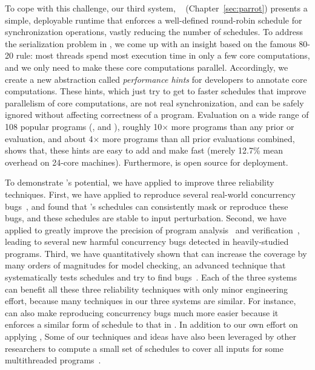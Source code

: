To cope with this challenge, our third \smt system, \parrot~\cite{parrot:sosp13}
(Chapter~\ref{sec:parrot}) presents a simple, deployable runtime that enforces a
well-defined round-robin schedule for synchronization operations, vastly
reducing the number of schedules. To address the serialization problem in \smt,
we come up with an insight based on the famous 80-20 rule: most threads spend
most execution time in only a few core computations, and we only need to make 
these core computations parallel. Accordingly, we create a new abstraction
called \emph{performance hints} for developers to annotate core computations.
These hints, which just try to get to faster schedules that improve parallelism
of core computations, are not real synchronization, and can be safely ignored
without affecting correctness of a program. Evaluation on a wide range of 108
popular programs (\eg, \bdb and \mplayer), roughly 10$\times$ more programs than
any prior \smt or \dmt evaluation, and about 4$\times$ more programs than all
prior evaluations combined, shows that, these hints are easy to add and make
\parrot fast (merely 12.7\% mean overhead on 24-core machines). Furthermore,
\parrot is open source for deployment.


To demonstrate \smt's potential, we have applied \smt to improve three
reliability techniques. First, we have applied \tern to reproduce several
real-world concurrency bugs~\cite{cui:tern:osdi10}, and found that \smt's
schedules can consistently mask or reproduce these bugs, and these schedules are
stable to input perturbation. Second, we have applied \peregrine to greatly
improve the precision of program analysis~\cite{wu:pldi12} and
verification~\cite{wu:pldi12}, leading to several new harmful concurrency bugs
detected in heavily-studied programs. Third, we have quantitatively shown that
\parrot can increase the coverage by many orders of magnitudes for model
checking, an advanced technique that systematically tests schedules and try to
find bugs~\cite{parrot:sosp13, dbug:spin11, modist:nsdi09}. Each of the three
systems can benefit all these three reliability techniques with only minor
engineering effort, because many techniques in our three \smt systems are
similar. For instance, \parrot can also make reproducing concurrency bugs much
more easier because it enforces a similar form of schedule to that in \tern. In
addition to our own effort on applying \smt, Some of our \smt techniques and
ideas have also been leveraged by other researchers to compute a small set of
schedules to cover all inputs for some multithreaded
programs~\cite{bergan:oopsla13}.

